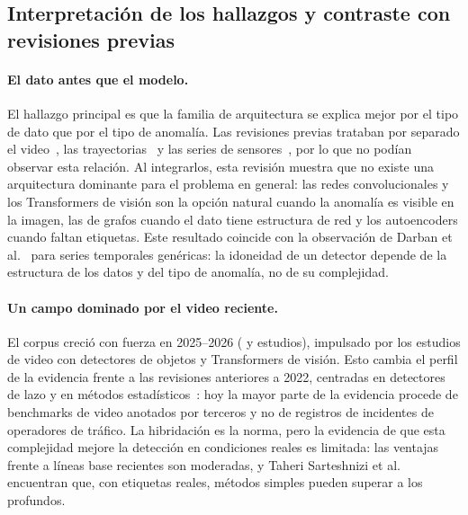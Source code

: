 \documentclass[12pt, a4paper]{article}
\begin{document}
\subsection{Interpretación de los hallazgos y contraste con revisiones previas}

\paragraph{El dato antes que el modelo.} El hallazgo principal es que la familia de arquitectura se explica mejor por el tipo de dato que por el tipo de anomalía. Las revisiones previas trataban por separado el video~\cite{santhosh2020anomaly,fang2024vision,lin2025deep}, las trayectorias~\cite{belhadi2020trajectory} y las series de sensores~\cite{djenouri2019survey}, por lo que no podían observar esta relación. Al integrarlos, esta revisión muestra que no existe una arquitectura dominante para el problema en general: las redes convolucionales y los Transformers de visión son la opción natural cuando la anomalía es visible en la imagen, las de grafos cuando el dato tiene estructura de red y los autoencoders cuando faltan etiquetas. Este resultado coincide con la observación de Darban et al.~\cite{darban2024deep} para series temporales genéricas: la idoneidad de un detector depende de la estructura de los datos y del tipo de anomalía, no de su complejidad.

\paragraph{Un campo dominado por el video reciente.} El corpus creció con fuerza en 2025--2026 (\AnioF{} y \AnioG{} estudios), impulsado por los estudios de video con detectores de objetos y Transformers de visión. Esto cambia el perfil de la evidencia frente a las revisiones anteriores a 2022, centradas en detectores de lazo y en métodos estadísticos~\cite{djenouri2019survey,zhang2020urban,elsahly2022systematic}: hoy la mayor parte de la evidencia procede de benchmarks de video anotados por terceros y no de registros de incidentes de operadores de tráfico. La hibridación es la norma, pero la evidencia de que esta complejidad mejore la detección en condiciones reales es limitada: las ventajas frente a líneas base recientes son moderadas, y Taheri Sarteshnizi et al.~\cite{taheri2026applicability} encuentran que, con etiquetas reales, métodos simples pueden superar a los profundos.
\end{document}

